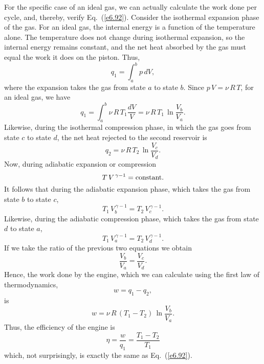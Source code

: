 For the specific case of an ideal gas, we can actually 
calculate the work done per cycle, and, thereby, verify Eq.~(\ref{e6.92}).
Consider the isothermal expansion phase of the gas. For an ideal gas, the internal
energy is a function of the temperature alone. The temperature does not
change during isothermal expansion, 
so the internal energy remains  constant, and the net heat absorbed by the
gas must equal the work it does on the piston. Thus,
\begin{equation}
q_1 = \int_a^b p \,dV,
\end{equation}
where the expansion takes the gas from state $a$ to state $b$. Since
$p\,V = \nu \,R \,T$, for an ideal gas, we have
\begin{equation}
q_1 = \int_a^b \nu\,R \,T_1\frac{ dV}{V} = \nu\, R\, T_1\, \ln\frac{V_b}{V_a}.
\end{equation}
Likewise,  during the isothermal compression phase, in which
 the gas goes from state $c$ to
state $d$, the net heat rejected to the second reservoir
is
\begin{equation}
q_2 = \nu\, R\, T_2\, \ln\frac{V_c}{V_d}.
\end{equation}
Now, during adiabatic expansion or compression
\begin{equation}
T \,V^{\,\gamma -1} = {\rm constant}.
\end{equation}
It follows that during the adiabatic expansion phase, which takes the gas from state
$b$ to state $c$, 
\begin{equation}
T_1 \,V_b^{\,\gamma -1} = T_2 \,V_c^{\,\gamma -1}.
\end{equation}
Likewise, during the adiabatic compression  phase, which takes the gas from
state $d$ to state $a$,
\begin{equation}
 T_1 \,V_a^{\,\gamma -1}= T_2 \,V_d^{\,\gamma -1}.
\end{equation}
If we take the ratio of the previous two equations we obtain
\begin{equation}
\frac{ V_b}{V_a} = \frac{V_c}{V_d}.
\end{equation}
Hence, the work done by the engine, which we can calculate using the first
law of thermodynamics,
\begin{equation}
w = q_1 - q_2,
\end{equation}
is 
\begin{equation}
w = \nu \,R \, (T_1 - T_2)\,\ln\frac{V_b}{V_a}.
\end{equation}
Thus, the efficiency of the engine
is
\begin{equation}
\eta = \frac{w}{q_1} = \frac{T_1 - T_2}{T_1}
\end{equation}
which, not surprisingly, is exactly the same as Eq.~(\ref{e6.92}).

